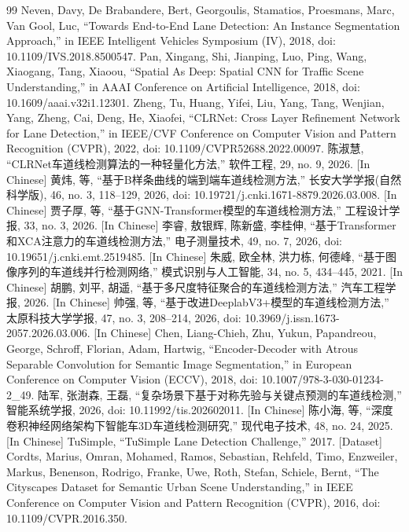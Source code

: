 \documentclass[journal]{IEEEtran}
\begin{document}
\begin{thebibliography}{99}
 Neven, Davy, De Brabandere, Bert, Georgoulis, Stamatios, Proesmans, Marc, Van Gool, Luc, “Towards End-to-End Lane Detection: An Instance Segmentation Approach,” in IEEE Intelligent Vehicles Symposium (IV), 2018, doi: 10.1109/IVS.2018.8500547.
 Pan, Xingang, Shi, Jianping, Luo, Ping, Wang, Xiaogang, Tang, Xiaoou, “Spatial As Deep: Spatial CNN for Traffic Scene Understanding,” in AAAI Conference on Artificial Intelligence, 2018, doi: 10.1609/aaai.v32i1.12301.
 Zheng, Tu, Huang, Yifei, Liu, Yang, Tang, Wenjian, Yang, Zheng, Cai, Deng, He, Xiaofei, “CLRNet: Cross Layer Refinement Network for Lane Detection,” in IEEE/CVF Conference on Computer Vision and Pattern Recognition (CVPR), 2022, doi: 10.1109/CVPR52688.2022.00097.
 陈淑慧, “CLRNet车道线检测算法的一种轻量化方法,” 软件工程, 29, no. 9, 2026. [In Chinese]
 黄炜, 等, “基于B样条曲线的端到端车道线检测方法,” 长安大学学报(自然科学版), 46, no. 3, 118--129, 2026, doi: 10.19721/j.cnki.1671-8879.2026.03.008. [In Chinese]
 贾子厚, 等, “基于GNN-Transformer模型的车道线检测方法,” 工程设计学报, 33, no. 3, 2026. [In Chinese]
 李睿, 敖银辉, 陈新盛, 李桂伸, “基于Transformer和XCA注意力的车道线检测方法,” 电子测量技术, 49, no. 7, 2026, doi: 10.19651/j.cnki.emt.2519485. [In Chinese]
 朱威, 欧全林, 洪力栋, 何德峰, “基于图像序列的车道线并行检测网络,” 模式识别与人工智能, 34, no. 5, 434--445, 2021. [In Chinese]
 胡鹏, 刘平, 胡遥, “基于多尺度特征聚合的车道线检测方法,” 汽车工程学报, 2026. [In Chinese]
 帅强, 等, “基于改进DeeplabV3+模型的车道线检测方法,” 太原科技大学学报, 47, no. 3, 208--214, 2026, doi: 10.3969/j.issn.1673-2057.2026.03.006. [In Chinese]
 Chen, Liang-Chieh, Zhu, Yukun, Papandreou, George, Schroff, Florian, Adam, Hartwig, “Encoder-Decoder with Atrous Separable Convolution for Semantic Image Segmentation,” in European Conference on Computer Vision (ECCV), 2018, doi: 10.1007/978-3-030-01234-2_49.
 陆军, 张澍森, 王磊, “复杂场景下基于对称先验与关键点预测的车道线检测,” 智能系统学报, 2026, doi: 10.11992/tis.202602011. [In Chinese]
 陈小海, 等, “深度卷积神经网络架构下智能车3D车道线检测研究,” 现代电子技术, 48, no. 24, 2025. [In Chinese]
 TuSimple, “TuSimple Lane Detection Challenge,” 2017. [Dataset]
 Cordts, Marius, Omran, Mohamed, Ramos, Sebastian, Rehfeld, Timo, Enzweiler, Markus, Benenson, Rodrigo, Franke, Uwe, Roth, Stefan, Schiele, Bernt, “The Cityscapes Dataset for Semantic Urban Scene Understanding,” in IEEE Conference on Computer Vision and Pattern Recognition (CVPR), 2016, doi: 10.1109/CVPR.2016.350.

\end{thebibliography}
\end{document}

